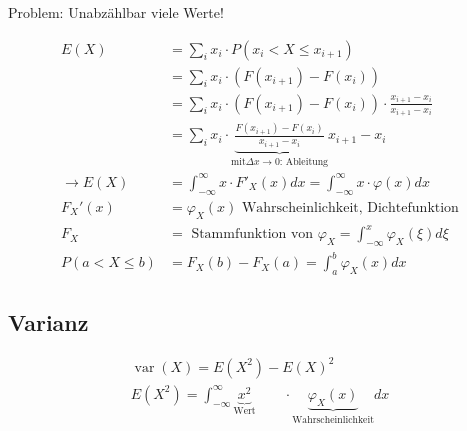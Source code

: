 \documentclass[10pt,a4paper]{scrartcl}
\newif\ifincludeExamples
\DeclareMathOperator{\var}{var}
\begin{document}
Problem: Unabzählbar viele Werte!

\begin{align*}
E(X) & = \sum_i x_i \cdot P(x_i < X \le x_{i+1}) \\
     & = \sum_i x_i \cdot \left(F(x_{i+1}) - F(x_i)\right) \\
     & = \sum_i x_i \cdot \left(F(x_{i+1}) - F(x_i)\right) \cdot \frac{x_{i+1} - x_i}{x_{i+1} - x_i} \\
     & = \sum_i x_i \cdot \underbrace{\frac{F(x_{i+1}) - F(x_i)}{x_{i+1} - x_i}}_{\text{mit} \Delta x \to 0 \text{: Ableitung}} x_{i+1} - x_i \\
\rightarrow  E(X) & = \int_{-\infty}^\infty x\cdot F'_X(x) dx = \int_{-\infty}^\infty x\cdot \varphi(x) dx \\
F_X'(x) & = \varphi_X (x)\text{ Wahrscheinlichkeit, Dichtefunktion} \\
F_X & = \text{ Stammfunktion von } \varphi_X = \int_{-\infty}^x \varphi_X(\xi)d\xi \\
P(a<X\le b) & = F_X(b) - F_X(a) = \int_a^b \varphi_X(x) dx
\end{align*}

\ifincludeExamples
\paragraph{Beispiel $\infty$-Würfel}
\begin{align*}
E(X) & = \int_{-\infty}^\infty x\cdot F'_X(x) dx & \text{F(x) ist } 0 \text{ links und rechts von } 0/2\pi \\
     & = \int_{-0}^{2\pi} x\cdot \frac{1}{2\pi} dx \\
     & = \left[ \frac{1}{4\pi} x^2\right]_0^{2\pi} = \frac{4\pi^2}{4\pi} = \pi 
\end{align*}
\fi

\subsection{Varianz}
\begin{align*}
\var(X) = E(X^2) - E(X)^2 \\
E(X^2) = \int_{-\infty}^\infty \underbrace{x^2}_{\text{Wert}}\qquad\cdot\underbrace{\varphi_X(x)}_{\text{Wahrscheinlichkeit}} dx \\
\end{align*}

\ifincludeExamples
\paragraph{Beispiel $\infty$-Würfel}
\begin{align*}
E(X^2) & = \int_{-\infty}^\infty x^2 \varphi_X(x) dx = \int_{-\infty}^\infty x^2 \frac{1}{2\pi} dx 
         = \left[\frac{x^3}{6\pi}\right]_0^{2\pi} = \frac{8\pi^3}{6\pi} = \frac{4}{3}\pi^2 \\
\var(X) & = E(X^2) - E(X)^2 = \frac{4}{3}\pi^2 - \pi^2 = \frac{1}{3}\pi^2, stddev = \frac{1}{\sqrt{3}}\pi = 0.58\pi
\end{align*}
\fi
\end{document}

